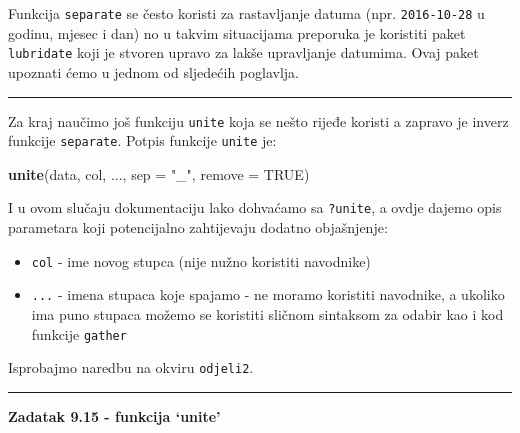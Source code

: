 \documentclass[]{book}
\newenvironment{Shaded}{\begin{snugshade}}{\end{snugshade}}
\newcommand{\KeywordTok}[1]{\textcolor[rgb]{0.13,0.29,0.53}{\textbf{#1}}}
\newcommand{\DataTypeTok}[1]{\textcolor[rgb]{0.13,0.29,0.53}{#1}}
\newcommand{\StringTok}[1]{\textcolor[rgb]{0.31,0.60,0.02}{#1}}
\newcommand{\CommentTok}[1]{\textcolor[rgb]{0.56,0.35,0.01}{\textit{#1}}}
\newcommand{\OtherTok}[1]{\textcolor[rgb]{0.56,0.35,0.01}{#1}}
\newcommand{\NormalTok}[1]{#1}
\providecommand{\tightlist}{%
  \setlength{\itemsep}{0pt}\setlength{\parskip}{0pt}}
\theoremstyle{definition}
\theoremstyle{definition}
\theoremstyle{definition}
\theoremstyle{remark}
\begin{document}
Funkcija \texttt{separate} se često koristi za rastavljanje datuma (npr.
\texttt{2016-10-28} u godinu, mjesec i dan) no u takvim situacijama
preporuka je koristiti paket \texttt{lubridate} koji je stvoren upravo
za lakše upravljanje datumima. Ovaj paket upoznati ćemo u jednom od
sljedećih poglavlja.

\begin{center}\rule{0.5\linewidth}{\linethickness}\end{center}

Za kraj naučimo još funkciju \texttt{unite} koja se nešto rijeđe koristi
a zapravo je inverz funkcije \texttt{separate}. Potpis funkcije
\texttt{unite} je:

\begin{Shaded}
\begin{Highlighting}[]
\KeywordTok{unite}\NormalTok{(data, col, ..., }\DataTypeTok{sep =} \StringTok{"_"}\NormalTok{, }\DataTypeTok{remove =} \OtherTok{TRUE}\NormalTok{)}
\end{Highlighting}
\end{Shaded}

I u ovom slučaju dokumentaciju lako dohvaćamo sa \texttt{?unite}, a
ovdje dajemo opis parametara koji potencijalno zahtijevaju dodatno
objašnjenje:

\begin{itemize}
\tightlist
\item
  \texttt{col} - ime novog stupca (nije nužno koristiti navodnike)
\item
  \texttt{...} - imena stupaca koje spajamo - ne moramo koristiti
  navodnike, a ukoliko ima puno stupaca možemo se koristiti sličnom
  sintaksom za odabir kao i kod funkcije \texttt{gather}
\end{itemize}

Isprobajmo naredbu na okviru \texttt{odjeli2}.

\begin{center}\rule{0.5\linewidth}{\linethickness}\end{center}

\textbf{Zadatak 9.15 - funkcija `unite'}

\begin{Shaded}
\end{Shaded}
\end{document}
